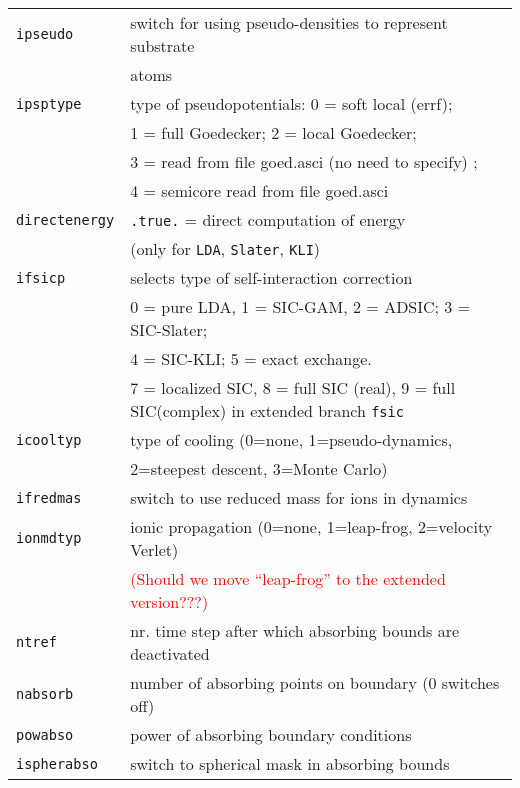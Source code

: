 \documentclass[12pt]{article}
\begin{document}
\begin{tabular}{ll}
{\tt ipseudo          }& switch for using pseudo-densities to represent substrate\\
{\tt                  }& atoms \\
{\tt ipsptype         }& type of pseudopotentials: 0 = soft local (errf);\\
                       & 1 = full Goedecker; 2 = local Goedecker;\\
                       & 3 = read from file goed.asci (no need to specify)  ;\\
                       & 4 = semicore read from file goed.asci\\
{\tt directenergy}   & {\tt .true.} = direct computation of energy \\
                       & (only for {\tt LDA}, {\tt Slater}, {\tt KLI})\\
{\tt ifsicp           }& selects type of self-interaction correction\\
    &  0 = pure LDA, 1 = SIC-GAM, 2 = ADSIC; 3 = SIC-Slater; \\
    &  4 = SIC-KLI; 5 = exact exchange. \\
    & 7 = localized SIC, 8 = full SIC (real), 9 = full SIC(complex)
     in extended branch {\tt fsic}\\
{\tt icooltyp         }& type of cooling (0=none, 1=pseudo-dynamics,\\
{\tt                  }& 2=steepest descent, 3=Monte Carlo)\\
{\tt ifredmas         }& switch to use reduced mass for ions in dynamics\\
{\tt ionmdtyp         }& ionic propagation
                         (0=none, 1=leap-frog, 2=velocity Verlet)\\
 & \textcolor{red}{(Should we move ``leap-frog'' to the extended version???)}\\
{\tt ntref}& nr. time step after which absorbing bounds are deactivated
\\
{\tt nabsorb}          & number of absorbing points on boundary (0 switches off) 
\\
{\tt powabso}          & power of absorbing boundary conditions
\\
{\tt ispherabso}       & switch to spherical mask in absorbing bounds
\\
\hline
\end{tabular}
\end{document}
